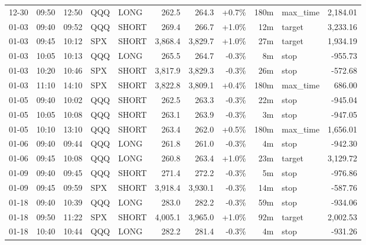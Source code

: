 \documentclass[11pt,a4paper,twoside]{article}
\begin{document}
\begin{center}
\begin{longtable}{>{\color{txtmain}}l l l l l r r r r >{\color{txtmain}}l r}
12-30 & 09:50 & 12:50 & QQQ & LONG & 262.5 & 264.3 & \textcolor{wingreen}{+0.7\%} & 180m & max\_time & \textcolor{wingreen}{2,184.01} \\
01-03 & 09:40 & 09:52 & QQQ & SHORT & 269.4 & 266.7 & \textcolor{wingreen}{+1.0\%} & 12m & target & \textcolor{wingreen}{3,233.16} \\
01-03 & 09:45 & 10:12 & SPX & SHORT & 3,868.4 & 3,829.7 & \textcolor{wingreen}{+1.0\%} & 27m & target & \textcolor{wingreen}{1,934.19} \\
01-03 & 10:05 & 10:13 & QQQ & LONG & 265.5 & 264.7 & \textcolor{lossred}{-0.3\%} & 8m & stop & \textcolor{lossred}{-955.73} \\
01-03 & 10:20 & 10:46 & SPX & SHORT & 3,817.9 & 3,829.3 & \textcolor{lossred}{-0.3\%} & 26m & stop & \textcolor{lossred}{-572.68} \\
01-03 & 11:10 & 14:10 & SPX & SHORT & 3,822.8 & 3,809.1 & \textcolor{wingreen}{+0.4\%} & 180m & max\_time & \textcolor{wingreen}{686.00} \\
01-05 & 09:40 & 10:02 & QQQ & SHORT & 262.5 & 263.3 & \textcolor{lossred}{-0.3\%} & 22m & stop & \textcolor{lossred}{-945.04} \\
01-05 & 10:05 & 10:08 & QQQ & SHORT & 263.1 & 263.9 & \textcolor{lossred}{-0.3\%} & 3m & stop & \textcolor{lossred}{-947.05} \\
01-05 & 10:10 & 13:10 & QQQ & SHORT & 263.4 & 262.0 & \textcolor{wingreen}{+0.5\%} & 180m & max\_time & \textcolor{wingreen}{1,656.01} \\
01-06 & 09:40 & 09:44 & QQQ & LONG & 261.8 & 261.0 & \textcolor{lossred}{-0.3\%} & 4m & stop & \textcolor{lossred}{-942.30} \\
01-06 & 09:45 & 10:08 & QQQ & LONG & 260.8 & 263.4 & \textcolor{wingreen}{+1.0\%} & 23m & target & \textcolor{wingreen}{3,129.72} \\
01-09 & 09:40 & 09:45 & QQQ & SHORT & 271.4 & 272.2 & \textcolor{lossred}{-0.3\%} & 5m & stop & \textcolor{lossred}{-976.86} \\
01-09 & 09:45 & 09:59 & SPX & SHORT & 3,918.4 & 3,930.1 & \textcolor{lossred}{-0.3\%} & 14m & stop & \textcolor{lossred}{-587.76} \\
01-18 & 09:40 & 10:39 & QQQ & LONG & 283.0 & 282.2 & \textcolor{lossred}{-0.3\%} & 59m & stop & \textcolor{lossred}{-934.06} \\
01-18 & 09:50 & 11:22 & SPX & SHORT & 4,005.1 & 3,965.0 & \textcolor{wingreen}{+1.0\%} & 92m & target & \textcolor{wingreen}{2,002.53} \\
01-18 & 10:40 & 10:44 & QQQ & LONG & 282.2 & 281.4 & \textcolor{lossred}{-0.3\%} & 4m & stop & \textcolor{lossred}{-931.26} \\

\end{longtable}
\end{center}
\end{document}
